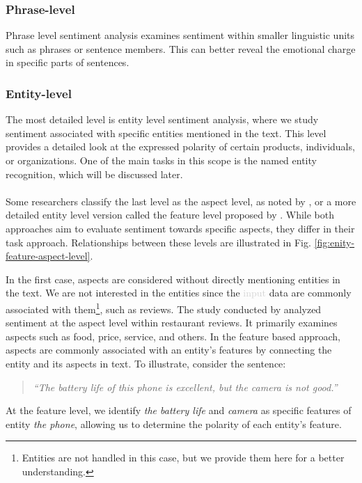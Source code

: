 \subsubsection*{Phrase-level}
\label{subsubsec:phrase-level}
Phrase level sentiment analysis examines sentiment within smaller linguistic units such as phrases or sentence members. This can better reveal the emotional charge in specific parts of sentences.

\subsubsection*{Entity-level}
\label{subsubsec:entity-level}
The most detailed level is entity level sentiment analysis, where we study sentiment associated with specific entities mentioned in the text. This level provides a detailed look at the expressed polarity of certain products, individuals, or organizations. One of the main tasks in this scope is the named entity recognition, which will be discussed later.

\paragraph{}

Some researchers classify the last level as the aspect level, as noted by \cite{Wankhade2022}, or a more detailed entity level version called the feature level proposed by \cite{Jenifer2017}. While both approaches aim to evaluate sentiment towards specific aspects, they differ in their task approach. Relationships between these levels are illustrated in Fig. \ref{fig:enity-feature-aspect-level}.

In the first case, aspects are considered without directly mentioning entities in the text. We are not interested in the entities since the \textcolor{lightgray}{input} data are commonly associated with them\footnote{Entities are not handled in this case, but we provide them here for a better understanding.}, such as reviews. The study conducted by \cites{Wang2019} analyzed sentiment at the aspect level within restaurant reviews. It primarily examines aspects such as food, price, service, and others. In the feature based approach, aspects are commonly associated with an entity's features by connecting the entity and its aspects in text. To illustrate, consider the sentence:\begin{quote}
    \textit{``The battery life of this phone is excellent, but the camera is not good.''}
\end{quote} At the feature level, we identify \textit{the battery life} and \textit{camera} as specific features of entity \textit{the phone}, allowing us to determine the polarity of each entity's feature.

